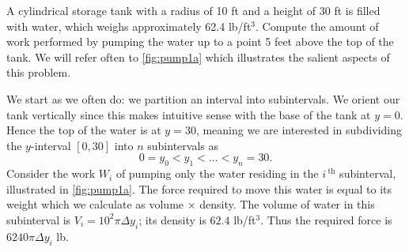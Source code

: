 \begin{example}\label{ex_pump1}%
A cylindrical storage tank with a radius of 10 ft and a height of 30 ft is filled with water, which weighs approximately 62.4 lb/ft$^3$. Compute the amount of work performed by pumping the water up to a point 5 feet above the top of the tank.
\solution
We will refer often to \autoref{fig:pump1a} which illustrates the salient aspects of this problem.


We start as we often do: we partition an interval into subintervals. We orient our tank vertically since this makes intuitive sense with the base of the tank at $y=0$. Hence the top of the water is at $y=30$, meaning we are interested in subdividing the $y$-interval $[0,30]$ into $n$ subintervals as 
\[0 = y_0 < y_1 < \dots < y_n = 30.\]
Consider the work $W_i$ of pumping only the water residing in the $i\,^\text{th}$ subinterval, illustrated in \autoref{fig:pump1a}. The force required to move this water is equal to its weight which we calculate as volume $\times $ density. The volume of water in this subinterval is 
$V_i = 10^2\pi \Delta y_i$; its density is $62.4$ lb/ft$^3$. Thus the required force is $6240\pi\Delta y_i$ lb.


\end{example}
